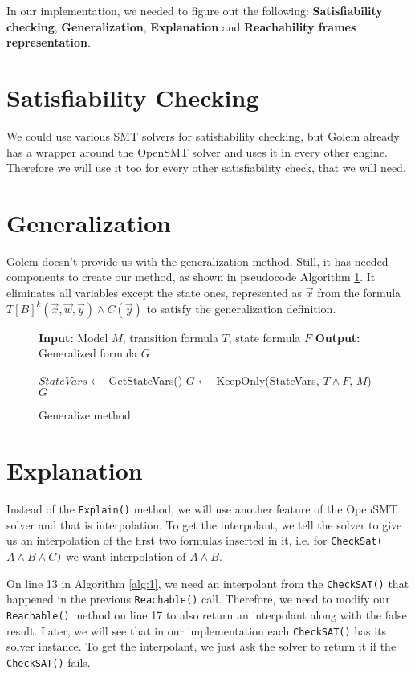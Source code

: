 In our implementation, we needed to figure out the following: \textbf{Satisfiability checking}, \textbf{Generalization}, \textbf{Explanation} and \textbf{Reachability frames representation}.

\section*{Satisfiability Checking}
\noindent We could use various SMT solvers for satisfiability checking, but Golem already has a wrapper around the OpenSMT solver and uses it in every other engine. Therefore we will use it too for every other satisfiability check, that we will need.

\section*{Generalization}
\noindent Golem doesn't provide us with the generalization method. Still, it has needed components to create our method, as shown in pseudocode Algorithm \ref{alg:2}. It eliminates all variables except the state ones, represented as $\vec{x}$ from the formula \( T[B]^k(\vec{x}, \vec{w}, \vec{y}) \wedge C(\vec{y}) \) to satisfy the generalization definition.
\begin{figure}[H]
\begin{mdframed}
\begin{algorithmic}[1]
\State \textbf{Input:} Model $M$, transition formula $T$, state formula $F$
\State \textbf{Output:} Generalized formula $G$

    \State $StateVars \gets$ GetStateVars()
    \State $G \gets$ KeepOnly(StateVars, $T \wedge F$, $M$)
    \State \Return $G$

\end{algorithmic}
\end{mdframed}
\caption{Generalize method}\label{alg:2}
\end{figure}

\section*{Explanation} \label{Explain}
\noindent Instead of the \texttt{Explain()} method, we will use another feature of the OpenSMT solver and that is interpolation. To get the interpolant, we tell the solver to give us an interpolation of the first two formulas inserted in it, i.e. for \texttt{CheckSat($A \wedge B \wedge C$)} we want interpolation of $A \wedge B$. 


On line 13 in Algorithm \ref{alg:1}, we need an interpolant from the \texttt{CheckSAT()} that happened in the previous \texttt{Reachable()} call. Therefore, we need to modify our \texttt{Reachable()} method on line 17 to also return an interpolant along with the false result. Later, we will see that in our implementation each \texttt{CheckSAT()} has its solver instance. To get the interpolant, we just ask the solver to return it if the \texttt{CheckSAT()} fails.

